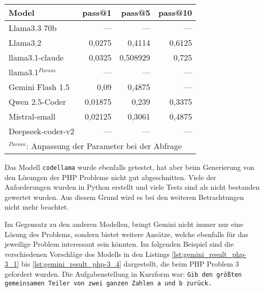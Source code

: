 \begin{table}[!ht]
	\begin{tabular}{|l|r|r|r|}
		\hline
		\textbf{Model} & \textbf{pass@1} & \textbf{pass@5} & \textbf{pass@10} \\
		\hline
		Llama3.3 70b      &     --- &      --- &    --- \\
		Llama3.2          &  0,0275 &   0,4114 & 0,6125 \\
		llama3.1-claude   &  0,0325 & 0,508929 &  0,725 \\
		llama3.1$^{Param}$&     --- &      --- &    --- \\
		Gemini Flash 1.5  &    0,09 &   0,4875 &    --- \\
		Qwen 2.5-Coder    & 0,01875 &    0,239 & 0,3375 \\
		Mistral-small     & 0,02125 &   0,3061 & 0,4875 \\
		Deepseek-coder-v2 &     --- &      --- &    --- \\
		\hline
		\multicolumn{4}{|l|}{$^{Param}$: Anpassung der Parameter bei der Abfrage} \\
		\hline
	\end{tabular}
	\centering
	\label{tab:prompt_results_open_models}
\end{table}

Das Modell \texttt{codellama} wurde ebenfalls getestet, hat aber beim Generierung von den Lösungen der PHP Probleme nicht gut abgeschnitten. Viele der Anforderungen wurden in Python erstellt und viele Tests sind als nicht bestanden gewertet wurden. Aus diesem Grund wird es bei den weiteren Betrachtungen nicht mehr beachtet.\vspace{0.2cm}


Im Gegensatz zu den anderen Modellen, bringt Gemini nicht immer nur eine Lösung des Problems, sondern bietet weitere Ansätze, welche ebenfalls für das jeweilige Problem interessant sein könnten. Im folgenden Beispiel sind die verschiedenen Vorschläge des Modells in den Listings \ref{lst:gemini_result_php-3_1} bis \ref{lst:gemini_result_php-3_4} dargestellt, die beim PHP Problem 3 gefordert wurden. Die Aufgabenstellung in Kurzform war: \texttt{Gib den größten gemeinsamen Teiler von zwei ganzen Zahlen a und b zurück.}

